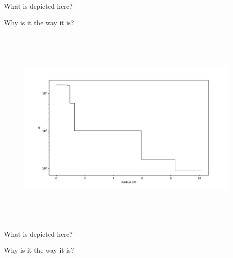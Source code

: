 What is depicted here?

Why is it the way it is?

\clearpage

%
\begin{figure}[htb]
\centering
\includegraphics[height=4in]{tex/figures/flux_rad.png}
\caption[]{}
\label{fig:}
\end{figure}

What is depicted here?

Why is it the way it is?

\clearpage
